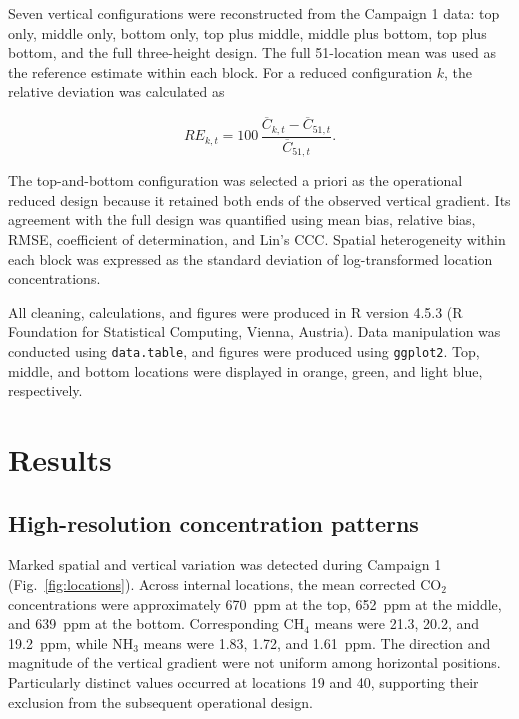 \documentclass[12pt,a4paper]{article}
\begin{document}
Seven vertical configurations were reconstructed from the Campaign 1 data:
top only, middle only, bottom only, top plus middle, middle plus bottom, top
plus bottom, and the full three-height design. The full 51-location mean was
used as the reference estimate within each block. For a reduced configuration
\(k\), the relative deviation was calculated as

\begin{equation}
RE_{k,t}=100\,
\frac{\overline{C}_{k,t}-\overline{C}_{51,t}}
     {\overline{C}_{51,t}}.
\end{equation}

The top-and-bottom configuration was selected a priori as the operational
reduced design because it retained both ends of the observed vertical
gradient. Its agreement with the full design was quantified using mean bias,
relative bias, RMSE, coefficient of determination, and Lin's CCC. Spatial
heterogeneity within each block was expressed as the standard deviation of
log-transformed location concentrations.

All cleaning, calculations, and figures were produced in R version 4.5.3
(R Foundation for Statistical Computing, Vienna, Austria). Data manipulation
was conducted using \texttt{data.table}, and figures were produced using
\texttt{ggplot2}. Top, middle, and bottom locations were displayed in orange,
green, and light blue, respectively.

\section{Results}

\subsection{High-resolution concentration patterns}

Marked spatial and vertical variation was detected during Campaign 1
(Fig.~\ref{fig:locations}). Across internal locations, the mean corrected
\(\mathrm{CO_2}\) concentrations were approximately \SI{670}{ppm} at the top,
\SI{652}{ppm} at the middle, and \SI{639}{ppm} at the bottom.
Corresponding \(\mathrm{CH_4}\) means were 21.3, 20.2, and
\SI{19.2}{ppm}, while \(\mathrm{NH_3}\) means were 1.83, 1.72, and
\SI{1.61}{ppm}. The direction and magnitude of the vertical gradient were not
uniform among horizontal positions. Particularly distinct values occurred at
locations 19 and 40, supporting their exclusion from the subsequent
operational design.
\end{document}
